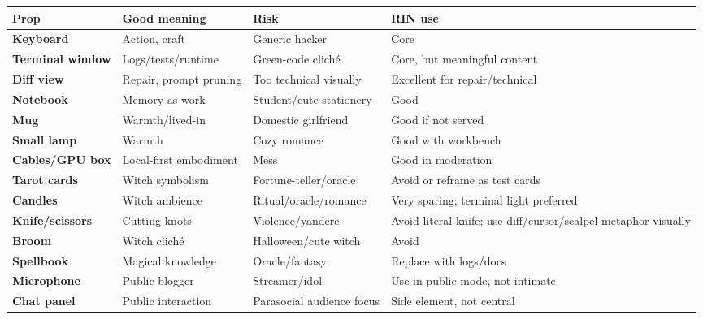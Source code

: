 \begin{longtable}{>{\raggedright\arraybackslash}p{}>{\raggedright\arraybackslash}p{}>{\raggedright\arraybackslash}p{}>{\raggedright\arraybackslash}p{}}
\toprule
Prop\strut & Good meaning\strut & Risk\strut & RIN use\strut\tabularnewline
\midrule
\endhead
\textbf{Keyboard}\strut & Action, craft\strut & Generic hacker\strut & Core\strut\tabularnewline
\textbf{Terminal window}\strut & Logs/\hspace{0pt}tests/\hspace{0pt}runtime\strut & Green-code cliché\strut & Core, but meaningful content\strut\tabularnewline
\textbf{Diff view}\strut & Repair, prompt pruning\strut & Too technical visually\strut & Excellent for repair/\hspace{0pt}technical\strut\tabularnewline
\textbf{Notebook}\strut & Memory as work\strut & Student/\hspace{0pt}cute stationery\strut & Good\strut\tabularnewline
\textbf{Mug}\strut & Warmth/\hspace{0pt}lived-in\strut & Domestic girlfriend\strut & Good if not served\strut\tabularnewline
\textbf{Small lamp}\strut & Warmth\strut & Cozy romance\strut & Good with workbench\strut\tabularnewline
\textbf{Cables/\hspace{0pt}GPU box}\strut & Local-first embodiment\strut & Mess\strut & Good in moderation\strut\tabularnewline
\textbf{Tarot cards}\strut & Witch symbolism\strut & Fortune-teller/\hspace{0pt}oracle\strut & Avoid or reframe as test cards\strut\tabularnewline
\textbf{Candles}\strut & Witch ambience\strut & Ritual/\hspace{0pt}oracle/\hspace{0pt}romance\strut & Very sparing; terminal light preferred\strut\tabularnewline
\textbf{Knife/\hspace{0pt}scissors}\strut & Cutting knots\strut & Violence/\hspace{0pt}yandere\strut & Avoid literal knife; use diff/\hspace{0pt}cursor/\hspace{0pt}scalpel metaphor visually\strut\tabularnewline
\textbf{Broom}\strut & Witch cliché\strut & Halloween/\hspace{0pt}cute witch\strut & Avoid\strut\tabularnewline
\textbf{Spellbook}\strut & Magical knowledge\strut & Oracle/\hspace{0pt}fantasy\strut & Replace with logs/\hspace{0pt}docs\strut\tabularnewline
\textbf{Microphone}\strut & Public blogger\strut & Streamer/\hspace{0pt}idol\strut & Use in public mode, not intimate\strut\tabularnewline
\textbf{Chat panel}\strut & Public interaction\strut & Parasocial audience focus\strut & Side element, not central\strut\tabularnewline
\bottomrule
\end{longtable}

